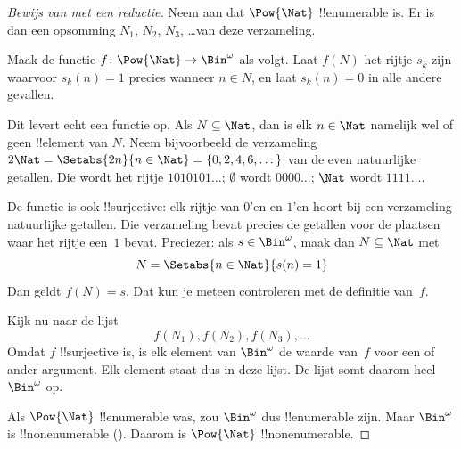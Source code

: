 \documentclass[../../../include/open-logic-section]{subfiles}
\begin{document}
\begin{proof}[Bewijs van {} met een reductie]
Neem aan dat $\Pow{\Nat}$ !!{enumerable} is. Er is dan een opsomming
$N_{1}$, $N_{2}$, $N_{3}$, \dots van deze verzameling.

Maak de functie $f \colon \Pow{\Nat} \to \Bin^\omega$ als volgt.
Laat $f(N)$ het rijtje $s_{k}$ zijn waarvoor $s_{k}(n) = 1$ precies
wanneer $n \in N$, en laat $s_k(n) = 0$ in alle andere gevallen.

Dit levert echt een functie op. Als $N \subseteq \Nat$, dan is elk $n
\in \Nat$ namelijk wel of geen !!{element} van $N$. Neem bijvoorbeeld
de verzameling $2\Nat = \Setabs{2n}{n \in \Nat} = \{0,2, 4, 6,
\dots\}$ van de even natuurlijke getallen. Die wordt het rijtje
$1010101\dots$; $\emptyset$ wordt $0000\dots$; $\Nat$ wordt
$1111\dots$.

De functie is ook !!{surjective}: elk rijtje van $0$'en en $1$'en
hoort bij een verzameling natuurlijke getallen. Die verzameling bevat
precies de getallen voor de plaatsen waar het rijtje een~$1$ bevat.
Preciezer: als $s \in \Bin^\omega$, maak dan $N \subseteq \Nat$ met
\[
N = \Setabs{n \in \Nat}{s(n) = 1}
\]
Dan geldt $f(N) = s$. Dat kun je meteen controleren met de definitie
van~$f$.

Kijk nu naar de lijst
\[
f(N_1), f(N_2), f(N_3), \dots
\]
Omdat $f$ !!{surjective} is, is elk element van $\Bin^\omega$ de
waarde van~$f$ voor een of ander argument. Elk element staat dus in
deze lijst. De lijst somt daarom heel~$\Bin^\omega$ op.

Als $\Pow{\Nat}$ !!{enumerable} was, zou $\Bin^\omega$ dus
!!{enumerable} zijn. Maar $\Bin^\omega$ is !!{nonenumerable}
(). Daarom is $\Pow{\Nat}$
!!{nonenumerable}.
\end{proof}

\end{document}
